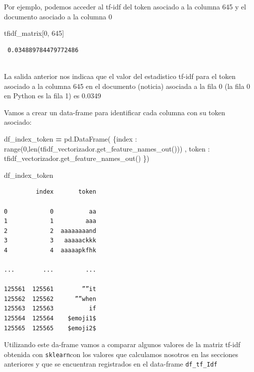 \documentclass[
  11pt,
  a4paper,
]{article}
\newenvironment{Shaded}{\begin{snugshade}}{\end{snugshade}}
\newcommand{\BuiltInTok}[1]{#1}
\newcommand{\DecValTok}[1]{\textcolor[rgb]{0.00,0.00,0.81}{#1}}
\newcommand{\NormalTok}[1]{#1}
\newcommand{\OperatorTok}[1]{\textcolor[rgb]{0.81,0.36,0.00}{\textbf{#1}}}
\newcommand{\StringTok}[1]{\textcolor[rgb]{0.31,0.60,0.02}{#1}}
\begin{document}
Por ejemplo, podemos acceder al tf-idf del token asociado a la columna
645 y el documento asociado a la columna 0

\begin{Shaded}
\begin{Highlighting}[]
\NormalTok{tfidf\_matrix[}\DecValTok{0}\NormalTok{, }\DecValTok{645}\NormalTok{]}
\end{Highlighting}
\end{Shaded}

\begin{verbatim}
 0.034889784479772486
 
\end{verbatim}

La salida anterior nos indicaa que el valor del estadistico tf-idf para
el token asociado a la columna 645 en el documento (noticia) asociada a
la fila 0 (la fila 0 en Python es la fila 1) es 0.0349

Vamos a crear un data-frame para identificar cada columna con su token
asociado:

\begin{Shaded}
\begin{Highlighting}[]
\NormalTok{df\_index\_token }\OperatorTok{=}\NormalTok{ pd.DataFrame( \{}\StringTok{\textquotesingle{}index\textquotesingle{}}\NormalTok{ : }\BuiltInTok{range}\NormalTok{(}\DecValTok{0}\NormalTok{,}\BuiltInTok{len}\NormalTok{(tfidf\_vectorizador.get\_feature\_names\_out())) , }\StringTok{\textquotesingle{}token\textquotesingle{}}\NormalTok{ : tfidf\_vectorizador.get\_feature\_names\_out() \})}

\NormalTok{df\_index\_token}
\end{Highlighting}
\end{Shaded}

\begin{verbatim}
         index       token

0            0          aa
1            1         aaa
2            2  aaaaaaaand
3            3   aaaaackkk
4            4  aaaaapkfhk

...        ...         ...

125561  125561        ””it
125562  125562      ””when
125563  125563          if
125564  125564    $emoji1$
125565  125565    $emoji2$
\end{verbatim}

Utilizando este da-frame vamos a comparar algunos valores de la matriz
tf-idf obtenida con \texttt{sklearn}con los valores que calculamos
nosotros en las secciones anteriores y que se encuentran registrados en
el data-frame \texttt{df\_tf\_Idf}
\end{document}
